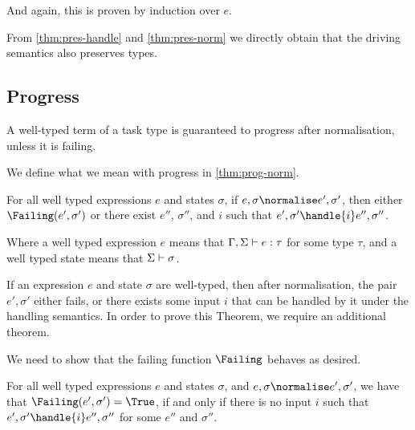 And again, this is proven by induction over $e$.

From \cref{thm:pres-handle} and \cref{thm:pres-norm} we directly
obtain that the driving semantics also preserves types.

\subsection{Progress}

A well-typed term of a task type is guaranteed to progress after normalisation,
unless it is failing.

We define what we mean with progress in \cref{thm:prog-norm}.
\begin{theorem}
  For all well typed expressions $e$ and states $\sigma$,
  if $e,\sigma \normalise e',\sigma'$,
  then either $\Failing(e', \sigma')$
  or there exist $e''$, $\sigma''$, and $i$ such that $e',\sigma'\handle{i} e'',\sigma''$.
  \label{thm:prog-norm}
\end{theorem}

Where a well typed expression $e$ means that $\Gamma,\Sigma\vdash e:\tau$ for
some type $\tau$, and a well typed state means that $\Sigma\vdash \sigma$.

If an expression $e$ and state $\sigma$ are well-typed, then after normalisation, the pair $e',\sigma'$
either fails, or there exists some input $i$ that can be handled by it under the handling semantics.
In order to prove this Theorem, we require an additional theorem.


We need to show that the failing function $\Failing$ behaves as desired.

\begin{theorem}
  For all well typed expressions $e$ and states $\sigma$,
  and $e,\sigma \normalise e',\sigma'$,
  we have that $\Failing(e',\sigma') = \True$,
  if and only if there is no input $i$
  such that $e',\sigma'\handle{i} e'',\sigma''$ for some $e''$ and $\sigma''$.
  \label{thm:failing}
\end{theorem}

